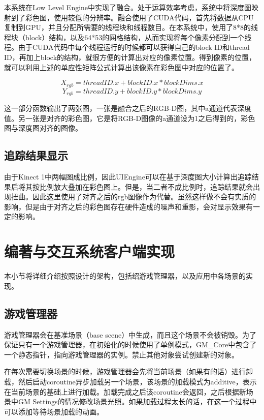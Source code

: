 本系统在Low Level Engine中实现了融合。处于运算效率考虑，系统中将深度图映射到了彩色图，使用较低的分辨率。融合使用了CUDA代码，首先将数据从CPU复制到GPU，并且分配所需要的线程块和线程数目。在本系统中，使用了8*8的线程块（block）结构，以及64*53的网格结构，从而实现将每个像素分配到一个线程。由于CUDA代码中每个线程运行的时候都可以获得自己的block ID和thread ID，再加上block的结构，就很方便的计算出对应的像素位置。得到像素的位置，就可以利用上述的单应性矩阵公式计算出该像素在彩色图中对应的位置了。
	
\begin{equation}
 X_{rgb} = threadID.x + blockID.x * blockDims.x
\end{equation}
\begin{equation}
 Y_{rgb} = threadID.y + blockID.y * blockDims.y
\end{equation}

这一部分函数输出了两张图，一张是融合之后的RGB-D图，其中a通道代表深度值。另一张是对齐的彩色图，它是将RGB-D图像的a通道设为1之后得到的，彩色图与深度图对齐的图像。

\subsection{追踪结果显示}

由于Kinect 1中两幅图成比例，因此UIEngine可以在基于深度图大小计算出追踪结果后将其按比例放大叠加在彩色图上。但是，当二者不成比例时，追踪结果就会出现扭曲。因此这里使用了对齐之后的rgb图像作为代替。虽然这样做不会有实质的影响，但是由于对齐之后的彩色图存在硬件造成的噪声和重影，会对显示效果有一定的影响。

\section{编著与交互系统客户端实现}
本小节将详细介绍按照设计的架构，包括绍游戏管理器，以及应用中各场景的实现。

\subsection{游戏管理器}
游戏管理器会在基准场景（base scene）中生成，而且这个场景不会被销毁。为了保证只有一个游戏管理器，在初始化的时候使用了单例模式，GM\_Core中包含了一个静态指针，指向游戏管理器的实例。禁止其他对象尝试创建新的对象。

在每次需要切换场景的时候，游戏管理器会先将当前场景（如果有的话）进行卸载，然后启动coroutine异步加载另一个场景，该场景的加载模式为additive，表示在当前场景的基础上进行加载。加载完成之后该coroutine会返回，之后根据新场景中GM Settings的情况修改场景光照。如果加载过程太长的话，在这一个过程中可以添加等待场景加载的动画。

